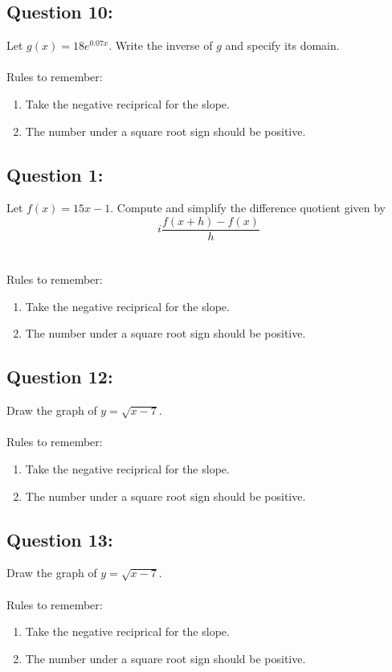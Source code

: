 \documentclass[12pt, letterpaper]{article}
\begin{document}
\subsection{Question 10:}
  Let $g(x)=18e^{0.07x}$. Write the inverse of $g$ and specify its domain.
  \\\\
  Rules to remember:
  \begin{enumerate}
    \item Take the negative reciprical for the slope.
    \item The number under a square root sign should be positive.
  \end{enumerate}

\subsection{Question 1:}
  Let $f(x)=15x-1$. Compute and simplify the difference quotient given by
  $$i\frac{f(x+h)-f(x)}{h}$$
  \\\\
  Rules to remember:
  \begin{enumerate}
    \item Take the negative reciprical for the slope.

    \item The number under a square root sign should be positive.
  \end{enumerate}

\subsection{Question 12:}
  Draw the graph of $y=\sqrt{x-7}$.
  \\\\
  Rules to remember:
  \begin{enumerate}
    \item Take the negative reciprical for the slope.
    \item The number under a square root sign should be positive.
  \end{enumerate}

\subsection{Question 13:}
  Draw the graph of $y=\sqrt{x-7}$.
  \\\\
  Rules to remember:
  \begin{enumerate}
    \item Take the negative reciprical for the slope.
    \item The number under a square root sign should be positive.
  \end{enumerate}
\end{document}
